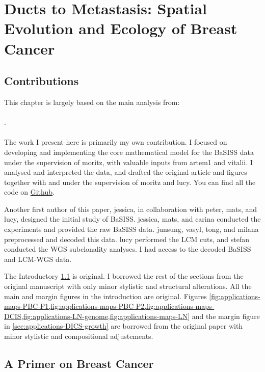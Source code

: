 \chapter{Ducts to Metastasis: Spatial Evolution and Ecology of Breast Cancer}
\label{sec:chapter-basiss-applications}

\section*{Contributions}
This chapter is largely based on the main analysis from:
\\~\\
 . 
\\~\\
The work I present here is primarily my own contribution. I focused on developing and implementing the core mathematical model for the \acs{BaSISS} data under the supervision of \ac{moritz}, with valuable inputs from \ac{artem1} and \ac{vitalii}. I analysed and interpreted the data, and drafted the original article and figures together with and under the supervision of \ac{moritz} and \ac{lucy}. You can find all the code on \href{https://github.com/gerstung-lab/BaSISS}{Github}.

Another first author of this paper, \ac{jessica}, in collaboration with \ac{peter}, \ac{mats}, and \ac{lucy}, designed the initial study of \acs{BaSISS}. \ac{jessica}, \ac{mats}, and \ac{carina} conducted the experiments and provided the raw \acs{BaSISS} data. \ac{junsung}, \ac{vasyl}, \ac{tong}, and \ac{milana} preprocessed and decoded this data. \ac{lucy} performed the \acs{LCM} cuts, and \ac{stefan} conducted the \acs{WGS} subclonality analyses. I had access to the decoded \acs{BaSISS} and \acs{LCM}-\acs{WGS} data.

The Introductory \cref{sec:applications-breast-intro} is original. I borrowed the rest of the sections from the original manuscript with only minor stylistic and structural alterations. All the main and margin figures in the introduction are original. Figures \cref{fig:applications-maps-PBC-P1,fig:applications-maps-PBC-P2,fig:applications-maps-DCIS,fig:applications-LN-genome,fig:applications-maps-LN} and the margin figure in \cref{sec:applications-DICS-growth} are borrowed from the original paper with minor stylistic and compositional adjustements.

\section{A Primer on Breast Cancer}
\label{sec:applications-breast-intro}

